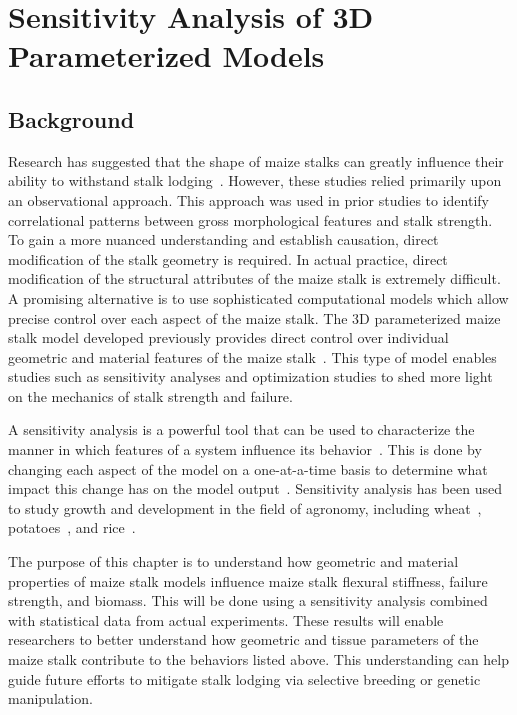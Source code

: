 \chapter{Sensitivity Analysis of 3D Parameterized Models}
\label{ch:ch4}

\section{Background}
\label{sec:ch4_background}
Research has suggested that the shape of maize stalks can greatly influence their ability to withstand stalk lodging~. However, these studies relied primarily upon an observational approach. This approach was used in prior studies to identify correlational patterns between gross morphological features and stalk strength. To gain a more nuanced understanding and establish causation, direct modification of the stalk geometry is required. In actual practice, direct modification of the structural attributes of the maize stalk is extremely difficult. A promising alternative is to use sophisticated computational models which allow precise control over each aspect of the maize stalk. The 3D parameterized maize stalk model developed previously provides direct control over individual geometric and material features of the maize stalk~. This type of model enables studies such as sensitivity analyses and optimization studies to shed more light on the mechanics of stalk strength and failure.

A sensitivity analysis is a powerful tool that can be used to characterize the manner in which features of a system influence its behavior~. This is done by changing each aspect of the model on a one-at-a-time basis to determine what impact this change has on the model output~. Sensitivity analysis has been used to study growth and development in the field of agronomy, including wheat~, potatoes~, and rice~. 

The purpose of this chapter is to understand how geometric and material properties of maize stalk models influence maize stalk flexural stiffness, failure strength, and biomass. This will be done using a sensitivity analysis combined with statistical data from actual experiments. These results will enable researchers to better understand how geometric and tissue parameters of the maize stalk contribute to the behaviors listed above. This understanding can help guide future efforts to mitigate stalk lodging via selective breeding or genetic manipulation.

